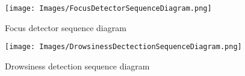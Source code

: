 \begin{figure}[h!]
    \centering
    \texttt{[image: Images/FocusDetectorSequenceDiagram.png]}
    \caption{Focus detector sequence diagram}
    \label{fig:FocusDetectorSequenceDiagram}
\end{figure}

\begin{figure}[h!]
    \centering
    \texttt{[image: Images/DrowsinessDectectionSequenceDiagram.png]}
    \caption{Drowsiness detection sequence diagram}
    \label{fig:DrowsinessDectectionSequenceDiagram}
\end{figure}

\newpage